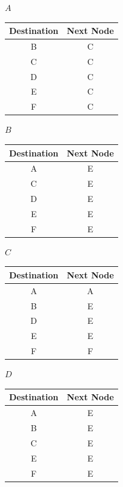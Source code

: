 \documentclass[11pt]{article}
\begin{document}
\begin{solution}
    $A$
    \begin{center}
        \begin{tabular}{ |c|c| } 
        Destination & Next Node \\ 
        \hline  
        B & C  \\ 
        C & C  \\ 
        D & C  \\ 
        E & C  \\ 
        F & C  \\ 
        \end{tabular}
    \end{center}
    $B$
    \begin{center}
        \begin{tabular}{ |c|c| } 
        Destination & Next Node \\ 
        \hline  
        A & E  \\ 
        C & E  \\ 
        D & E  \\ 
        E & E  \\ 
        F & E  \\ 
        \end{tabular}
    \end{center}
    $C$
    \begin{center}
        \begin{tabular}{ |c|c| } 
        Destination & Next Node \\ 
        \hline  
        A & A  \\ 
        B & E  \\ 
        D & E  \\ 
        E & E  \\ 
        F & F  \\ 
        \end{tabular}
    \end{center}
    $D$
    \begin{center}
        \begin{tabular}{ |c|c| } 
        Destination & Next Node \\ 
        \hline  
        A & E  \\ 
        B & E  \\ 
        C & E  \\ 
        E & E  \\ 
        F & E  \\ 
        \end{tabular}
    \end{center}

\end{solution}
\end{document}
